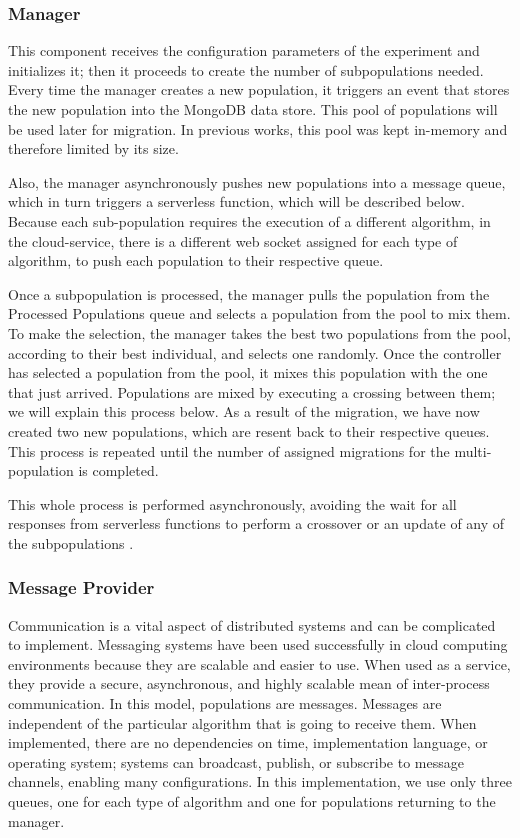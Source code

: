 \documentclass[runningheads]{llncs}
\begin{document}
\subsubsection{Manager}

This component receives the configuration parameters of
  the experiment and initializes it; then it proceeds to create the
  number of subpopulations needed. Every time the manager creates a new
  population, it triggers an event that stores the new population into the
  MongoDB data store. This pool of populations will be used later for migration.
  In previous works, this pool was kept in-memory and
  therefore limited by its size. 

  Also, the manager asynchronously pushes new populations into a message queue,
  which in turn triggers a serverless function, which will be
  described below. Because each sub-population
  requires the execution of a different algorithm, in the cloud-service, there is a different
  web socket assigned for each type of algorithm, to push each population to
  their respective queue.

 Once a subpopulation is processed, the manager pulls the population from the
  Processed Populations queue and selects a population from the pool to mix
  them. To make the selection, the manager takes the best two populations from
  the pool, according to their best individual, and selects one randomly. Once
  the controller has selected a population from the pool, it mixes this
  population with the one that just arrived. Populations are mixed by executing
  a crossing between them; we will explain this process below. As a result of
  the migration, we have now created two new populations, which are resent back
  to their respective queues. This process is repeated until the number of
  assigned migrations for the multi-population \cite{Ma2019,Santander-jim2018}
  is completed.

This whole
  process is performed asynchronously, avoiding the wait for all responses from
  serverless functions to perform a crossover or an update of any of the
  subpopulations \cite{Lovbjerg2001,Jimeno2019}. 

  \subsubsection{Message Provider}

  Communication is a vital aspect of distributed
systems and can be complicated to implement. Messaging systems have been used
successfully in cloud computing environments because they are scalable and
easier to use. When used as a service, they provide a secure, asynchronous, and
highly scalable mean of inter-process communication.  In this model, populations
are messages.  Messages are independent of the particular algorithm that is
going to receive them. When implemented, there are no dependencies on time,
implementation language, or operating system; systems can broadcast, publish, or
subscribe to message channels, enabling many configurations. In this
implementation,  we use only three queues, one for each type of algorithm and
one for populations returning to the manager.
\end{document}
